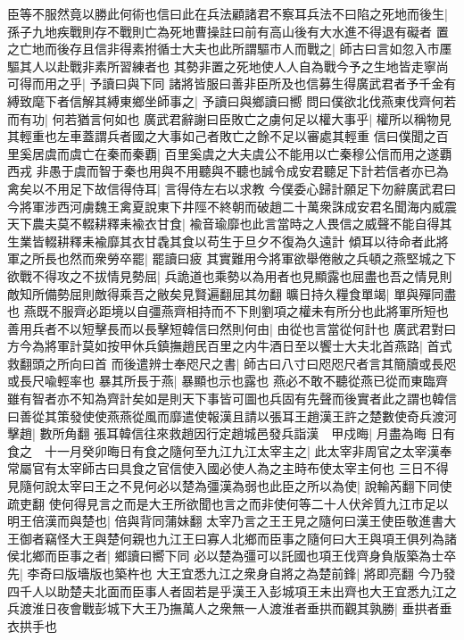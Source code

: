 臣等不服然竟以勝此何術也信曰此在兵法顧諸君不察耳兵法不曰陷之死地而後生|{
	孫子九地疾戰則存不戰則亡為死地曹操註曰前有高山後有大水進不得退有礙者}
置之亡地而後存且信非得素拊循士大夫也此所謂驅市人而戰之|{
	師古曰言如忽入市㕓驅其人以赴戰非素所習練者也}
其勢非置之死地使人人自為戰今予之生地皆走寧尚可得而用之乎|{
	予讀曰與下同}
諸將皆服曰善非臣所及也信募生得廣武君者予千金有縛致麾下者信解其縛東鄉坐師事之|{
	予讀曰與鄉讀曰嚮}
問曰僕欲北伐燕東伐齊何若而有功|{
	何若猶言何如也}
廣武君辭謝曰臣敗亡之虜何足以權大事乎|{
	權所以稱物見其輕重也左車蓋謂兵者國之大事如己者敗亡之餘不足以審處其輕重}
信曰僕聞之百里奚居虞而虞亡在秦而秦覇|{
	百里奚虞之大夫虞公不能用以亡秦穆公信而用之遂覇西戎}
非愚于虞而智于秦也用與不用聽與不聽也誠令成安君聽足下計若信者亦已為禽矣以不用足下故信得侍耳|{
	言得侍左右以求教}
今僕委心歸計願足下勿辭廣武君曰今將軍涉西河虜魏王禽夏說東下井陘不終朝而破趙二十萬衆誅成安君名聞海内威震天下農夫莫不輟耕釋耒褕衣甘食|{
	褕音瑜靡也此言當時之人畏信之威聲不能自得其生業皆輟耕釋耒褕靡其衣甘毳其食以苟生于旦夕不復為久遠計}
傾耳以待命者此將軍之所長也然而衆勞卒罷|{
	罷讀曰疲}
其實難用今將軍欲舉倦敝之兵頓之燕堅城之下欲戰不得攻之不拔情見勢屈|{
	兵詭道也乘勢以為用者也見顯露也屈盡也吾之情見則敵知所備勢屈則敵得乘吾之敝矣見賢遍翻屈其勿翻}
曠日持久糧食單竭|{
	單與殫同盡也}
燕既不服齊必距境以自彊燕齊相持而不下則劉項之權未有所分也此將軍所短也善用兵者不以短擊長而以長擊短韓信曰然則何由|{
	由從也言當從何計也}
廣武君對曰方今為將軍計莫如按甲休兵鎮撫趙民百里之内牛酒日至以饗士大夫北首燕路|{
	首式救翻頭之所向曰首}
而後遣辨士奉咫尺之書|{
	師古曰八寸曰咫咫尺者言其簡牘或長咫或長尺喩輕率也}
暴其所長于燕|{
	暴顯也示也露也}
燕必不敢不聽從燕已從而東臨齊雖有智者亦不知為齊計矣如是則天下事皆可圖也兵固有先聲而後實者此之謂也韓信曰善從其策發使使燕燕從風而靡遣使報漢且請以張耳王趙漢王許之楚數使奇兵渡河擊趙|{
	數所角翻}
張耳韓信往來救趙因行定趙城邑發兵詣漢　甲戍晦|{
	月盡為晦}
日有食之　十一月癸卯晦日有食之隨何至九江九江太宰主之|{
	此太宰非周官之太宰漢奉常屬官有太宰師古曰具食之官信使入國必使人為之主時布使太宰主何也}
三日不得見隨何說太宰曰王之不見何必以楚為彊漢為弱也此臣之所以為使|{
	說輸芮翻下同使疏吏翻}
使何得見言之而是大王所欲聞也言之而非使何等二十人伏斧質九江市足以明王倍漢而與楚也|{
	倍與背同蒲妹翻}
太宰乃言之王王見之隨何曰漢王使臣敬進書大王御者竊怪大王與楚何親也九江王曰寡人北鄉而臣事之隨何曰大王與項王俱列為諸侯北鄉而臣事之者|{
	鄉讀曰嚮下同}
必以楚為彊可以託國也項王伐齊身負版築為士卒先|{
	李奇曰版墻版也築杵也}
大王宜悉九江之衆身自將之為楚前鋒|{
	將即亮翻}
今乃發四千人以助楚夫北面而臣事人者固若是乎漢王入彭城項王未出齊也大王宜悉九江之兵渡淮日夜會戰彭城下大王乃撫萬人之衆無一人渡淮者垂拱而觀其孰勝|{
	垂拱者垂衣拱手也}
